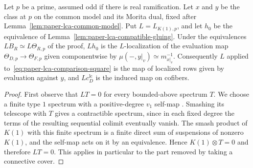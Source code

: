 \begin{lemma}
\label{lem:paper-lca-periodic-evaluation}
Let $p$ be a prime, assumed odd if there is real ramification.
Let $x$ and $y$ be the class at $p$ on the common model and its Morita dual, fixed after Lemma~\ref{lem:paper-lca-common-model}.
Put $L=L_{K(1),p}$, and let $h_0$ be the equivalence of Lemma~\ref{lem:paper-lca-compatible-gluing}.
Under the equivalences $LB_R\simeq L\Theta_{R,p}$ of the proof, $Lh_0$ is the $L$-localization of the evaluation map $\Theta_{D,p}\to\Theta_{F,p}$ given componentwise by $\mu(-,y|_v)\simeq m_{x|_v}^{-1}$.
Consequently $L$ applied to~\eqref{eq:paper-lca-comparison-square} is the map of localized rows given by evaluation against $y$, and $Lc^{\mathrm{lc}}_D$ is the induced map on cofibers.
\end{lemma}
\begin{proof}
First observe that $LT=0$ for every bounded-above spectrum $T$.
We choose a finite type $1$ spectrum with a positive-degree $v_1$ self-map \cite{HopkinsSmith1998}.
Smashing its telescope with $T$ gives a contractible spectrum, since in each fixed degree the terms of the resulting sequential colimit eventually vanish.
The smash product of $K(1)$ with this finite spectrum is a finite direct sum of suspensions of nonzero $K(1)$, and the self-map acts on it by an equivalence.
Hence $K(1)\otimes T=0$ and therefore $LT=0$.
This applies in particular to the part removed by taking a connective cover.


\end{proof}
